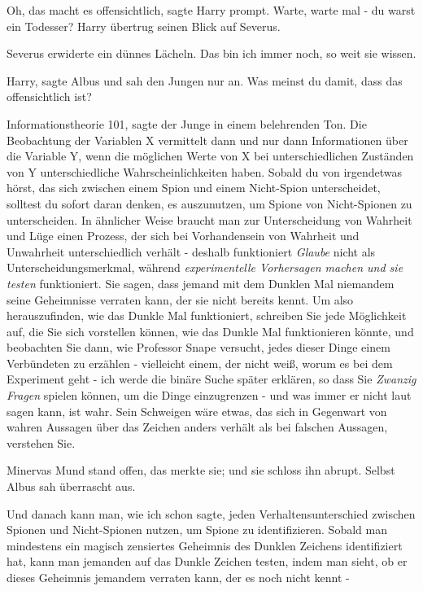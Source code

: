 \glqq Oh, das macht es offensichtlich\grqq{}, sagte Harry prompt. \glqq Warte,
warte mal - du warst ein Todesser?\grqq{} Harry übertrug seinen Blick auf
Severus.

Severus erwiderte ein dünnes Lächeln. \glqq Das bin ich immer noch, so weit sie
wissen.\grqq{}

\glqq Harry\grqq{}, sagte Albus und sah den Jungen nur an. \glqq Was meinst du
damit, dass das offensichtlich ist?\grqq{}

\glqq Informationstheorie 101\grqq{}, sagte der Junge in einem belehrenden Ton.
\glqq Die Beobachtung der Variablen X vermittelt dann und nur dann Informationen
über die Variable Y, wenn die möglichen Werte von X bei unterschiedlichen
Zuständen von Y unterschiedliche Wahrscheinlichkeiten haben. Sobald du von
irgendetwas hörst, das sich zwischen einem Spion und einem Nicht-Spion
unterscheidet, solltest du sofort daran denken, es auszunutzen, um Spione von
Nicht-Spionen zu unterscheiden. In ähnlicher Weise braucht man zur
Unterscheidung von Wahrheit und Lüge einen Prozess, der sich bei Vorhandensein
von Wahrheit und Unwahrheit unterschiedlich verhält - deshalb funktioniert \glqq
\emph{Glaube}\grqq{} nicht als Unterscheidungsmerkmal, während \glqq
\emph{experimentelle Vorhersagen machen und sie testen}\grqq{} funktioniert. Sie
sagen, dass jemand mit dem Dunklen Mal niemandem seine Geheimnisse verraten
kann, der sie nicht bereits kennt. Um also herauszufinden, wie das Dunkle Mal
funktioniert, schreiben Sie jede Möglichkeit auf, die Sie sich vorstellen
können, wie das Dunkle Mal funktionieren könnte, und beobachten Sie dann, wie
Professor Snape versucht, jedes dieser Dinge einem Verbündeten zu erzählen -
vielleicht einem, der nicht weiß, worum es bei dem Experiment geht - ich werde
die binäre Suche später erklären, so dass Sie \emph{Zwanzig Fragen} spielen
können, um die Dinge einzugrenzen - und was immer er nicht laut sagen kann, ist
wahr. Sein Schweigen wäre etwas, das sich in Gegenwart von wahren Aussagen über
das Zeichen anders verhält als bei falschen Aussagen, verstehen Sie.\grqq{}

Minervas Mund stand offen, das merkte sie; und sie schloss ihn abrupt. Selbst
Albus sah überrascht aus.

\glqq Und danach kann man, wie ich schon sagte, jeden Verhaltensunterschied
zwischen Spionen und Nicht-Spionen nutzen, um Spione zu identifizieren. Sobald
man mindestens ein magisch zensiertes Geheimnis des Dunklen Zeichens
identifiziert hat, kann man jemanden auf das Dunkle Zeichen testen, indem man
sieht, ob er dieses Geheimnis jemandem verraten kann, der es noch nicht kennt
-\grqq{}


